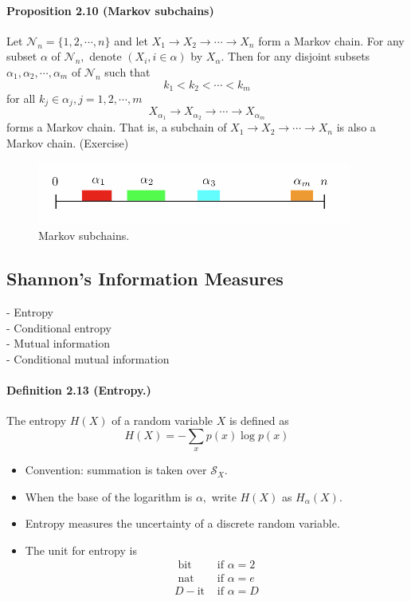 \documentclass[8pt]{article}
\begin{document}
\begin{tcolorbox}
\paragraph{Proposition 2.10 (Markov subchains)} Let $\mathcal{N}_{n}=\{1,2, \cdots, n\}$ and let $X_{1} \rightarrow X_{2} \rightarrow \cdots \rightarrow X_{n}$ form a Markov chain. For any subset $\alpha$ of $\mathcal{N}_{n},$ denote $\left(X_{i}, i \in \alpha\right)$ by $X_{\alpha} .$ Then for any disjoint subsets $\alpha_{1}, \alpha_{2}, \cdots, \alpha_{m}$ of $\mathcal{N}_{n}$ such that
$$
k_{1}<k_{2}<\cdots<k_{m}
$$
for all $k_{j} \in \alpha_{j}, j=1,2, \cdots, m$
$$
X_{\alpha_{1}} \rightarrow X_{\alpha_{2}} \rightarrow \cdots \rightarrow X_{\alpha_{m}}
$$
forms a Markov chain. That is, a subchain of $X_{1} \rightarrow X_{2} \rightarrow \cdots \rightarrow X_{n}$ is also a Markov chain. (Exercise)
\end{tcolorbox}
\begin{figure}[!h]
    \centering
    \includegraphics[width=0.4\linewidth]{imgs/def2_10.png}
    \caption{Markov subchains.}
    \label{fig:my_label}
\end{figure}

\newpage
\subsection{Shannon's Information Measures}
- Entropy\\
- Conditional entropy\\
- Mutual information\\
- Conditional mutual information\\

\begin{tcolorbox}
\paragraph{Definition 2.13 (Entropy.)} The entropy $H(X)$ of a random variable $X$ is defined as
$$
H(X)=-\sum_{x} p(x) \log p(x)
$$
\begin{itemize}
    \item Convention: summation is taken over $\mathcal{S}_{X}$. 
    \item When the base of the logarithm is $\alpha,$ write $H(X)$ as $H_{\alpha}(X)$.
    \item Entropy measures the uncertainty of a discrete random variable.
    \item The unit for entropy is
        $$
        \begin{array}{ll}
        \text { bit } & \text { if } \alpha=2\\
        \text { nat } & \text { if } \alpha=e\\
        D-\mathrm{it} & \text { if } \alpha=D
        \end{array}
        $$
\end{itemize}
\end{tcolorbox}
\end{document}
